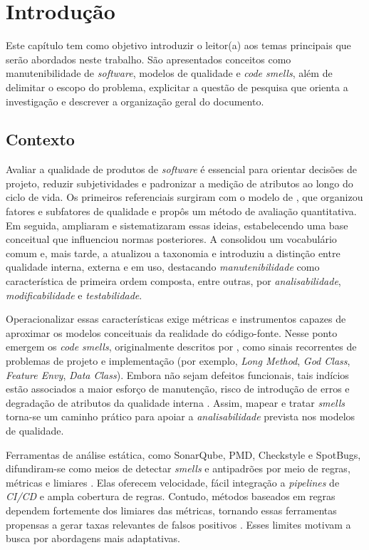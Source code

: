 
\chapter[Introdução]{Introdução}

Este capítulo tem como objetivo introduzir o leitor(a) aos temas principais que serão abordados neste trabalho. São apresentados conceitos como manutenibilidade de \textit{software}, 
modelos de qualidade e \textit{code smells}, além de delimitar o escopo do problema, explicitar a 
questão de pesquisa que orienta a investigação e descrever a organização geral do documento.

\section{Contexto}

Avaliar a qualidade de produtos de \textit{software} é essencial para orientar decisões de projeto, reduzir 
subjetividades e padronizar a medição de atributos ao longo do ciclo de vida. Os primeiros referenciais surgiram 
com o modelo de , que organizou fatores e subfatores de qualidade e propôs um método de 
avaliação quantitativa. Em seguida,  ampliaram e sistematizaram essas ideias, 
estabelecendo uma base conceitual que influenciou normas posteriores. A  consolidou um 
vocabulário comum e, mais tarde, a  atualizou a taxonomia e introduziu a distinção entre 
qualidade interna, externa e em uso, destacando \textit{manutenibilidade} como característica de primeira ordem 
composta, entre outras, por \textit{analisabilidade}, \textit{modificabilidade} e \textit{testabilidade}.

Operacionalizar essas características exige métricas e instrumentos capazes de aproximar os modelos conceituais 
da realidade do código-fonte. Nesse ponto emergem os \textit{code smells}, originalmente descritos por , 
como sinais recorrentes de problemas de projeto e implementação (por exemplo, \textit{Long Method}, \textit{God Class}, 
\textit{Feature Envy}, \textit{Data Class}). Embora não sejam defeitos funcionais, tais indícios estão associados a maior 
esforço de manutenção, risco de introdução de erros e degradação de atributos da qualidade interna \cite{Lanza2006}. 
Assim, mapear e tratar \textit{smells} torna-se um caminho prático para apoiar a \textit{analisabilidade} prevista nos modelos de qualidade.

Ferramentas de análise estática, como SonarQube, PMD, Checkstyle e SpotBugs, difundiram-se como meios de detectar \textit{smells} e 
antipadrões por meio de regras, métricas e limiares \cite{sonarq,pmdbox,checkstyle,spotbugs}. Elas oferecem velocidade, 
fácil integração a \textit{pipelines} de \textit{CI/CD} e ampla cobertura de regras. Contudo, métodos baseados em regras dependem fortemente dos limiares das métricas,
tornando essas ferramentas propensas a gerar taxas relevantes de falsos positivos \cite{SharmaSpinellis2018}. Esses limites motivam a 
busca por abordagens mais adaptativas.

